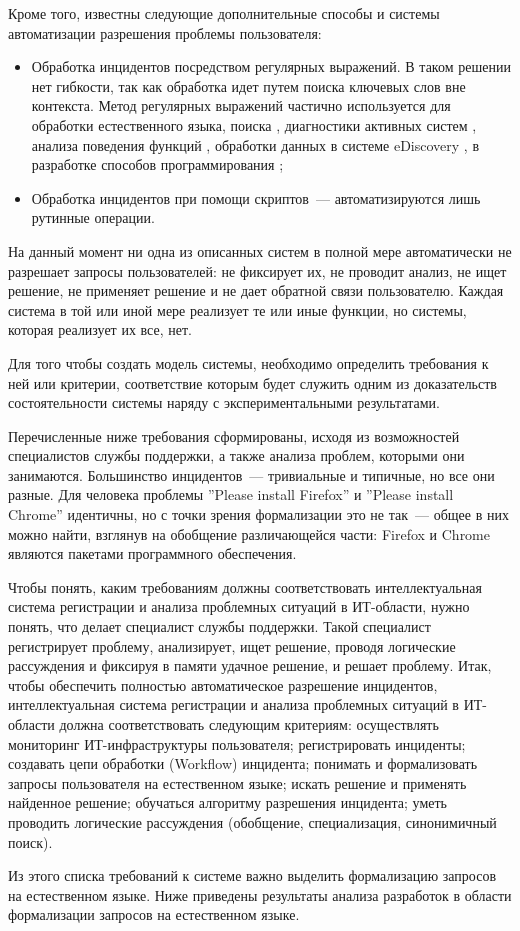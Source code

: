 Кроме того, известны следующие дополнительные способы и системы автоматизации разрешения проблемы пользователя:
\begin{itemize}
	\item Обработка инцидентов посредством регулярных выражений. В таком решении нет гибкости, так как обработка идет путем поиска ключевых слов вне контекста. Метод регулярных выражений частично используется для обработки естественного языка, поиска  \cite{REG1}, диагностики активных систем \cite{REG2}, анализа поведения функций \cite{REG4}, обработки данных в системе eDiscovery \cite{REG5}, в разработке способов программирования \cite{REG3};
	\item Обработка инцидентов при помощи скриптов~--- автоматизируются лишь рутинные операции.
\end{itemize} \par
На данный момент ни одна из описанных систем в полной мере автоматически не разрешает запросы пользователей: не фиксирует их, не проводит анализ, не ищет решение, не применяет решение и не дает обратной связи пользователю. Каждая система в той или иной мере реализует те или иные функции, но системы, которая реализует их все, нет. \par

Для того чтобы создать модель системы, необходимо определить требования к ней или критерии, соответствие которым будет служить одним из доказательств состоятельности системы наряду с экспериментальными результатами. \par

Перечисленные ниже требования сформированы, исходя из возможностей специалистов службы поддержки, а также анализа проблем, которыми они занимаются. Большинство инцидентов~--- тривиальные и типичные, но все они разные. Для человека проблемы ”Please install Firefox” и ”Please install Chrome” идентичны, но с точки зрения формализации это не так~--- общее в них можно найти, взглянув на обобщение различающейся части: Firefox и Chrome являются пакетами программного обеспечения. \par 
Чтобы понять, каким требованиям должны соответствовать интеллектуальная система регистрации и анализа проблемных ситуаций в ИТ-области, нужно понять, что делает специалист службы поддержки. Такой специалист регистрирует проблему, анализирует, ищет решение, проводя логические рассуждения и фиксируя в памяти удачное решение, и решает проблему. Итак, чтобы обеспечить полностью автоматическое разрешение инцидентов, интеллектуальная система регистрации и анализа проблемных ситуаций в ИТ-области должна соответствовать следующим критериям: осуществлять мониторинг ИТ-инфраструктуры пользователя; регистрировать инциденты; создавать цепи обработки (Workflow) инцидента; понимать и формализовать запросы пользователя на естественном языке; искать решение и применять найденное решение; обучаться алгоритму разрешения инцидента; уметь проводить логические рассуждения (обобщение, специализация, синонимичный поиск). \par
Из этого списка требований к системе важно выделить формализацию запросов на естественном языке. Ниже приведены результаты анализа разработок в области формализации запросов на естественном языке. 


